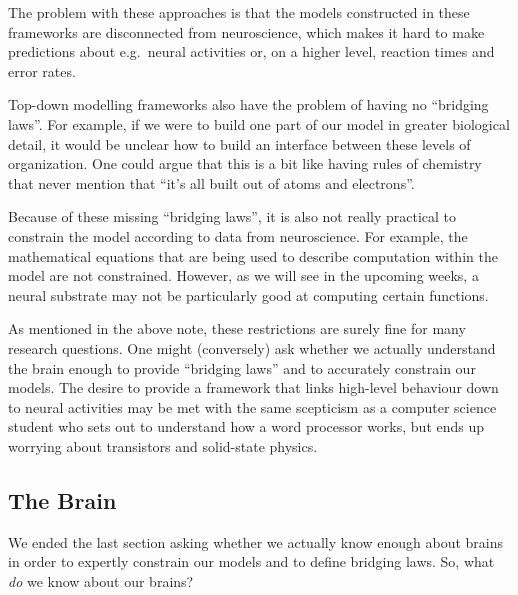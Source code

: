 \documentclass[10pt,letterpaper,oneside]{article}
\begin{document}
The problem with these approaches is that the models constructed in these frameworks are disconnected from neuroscience, which makes it hard to make predictions about e.g.~neural activities or, on a higher level, reaction times and error rates.

Top-down modelling frameworks also have the problem of having no \enquote{bridging laws}. For example, if we were to build one part of our model in greater biological detail, it would be unclear how to build an interface between these levels of organization. One could argue that this is a bit like having rules of chemistry that never mention that \enquote{it's all built out of atoms and electrons}.

Because of these missing \enquote{bridging laws}, it is also not really practical to constrain the model according to data from neuroscience. For example, the mathematical equations that are being used to describe computation within the model are not constrained. However, as we will see in the upcoming weeks, a neural substrate may not be particularly good at computing certain functions.

As mentioned in the above note, these restrictions are surely fine for many research questions. One might (conversely) ask whether we actually understand the brain enough to provide \enquote{bridging laws} and to accurately constrain our models. The desire to provide a framework that links high-level behaviour down to neural activities may be met with the same scepticism as a computer science student who sets out to understand how a word processor works, but ends up worrying about transistors and solid-state physics.




\subsection{The Brain}

We ended the last section asking whether we actually know enough about brains in order to expertly constrain our models and to define bridging laws. So, what \emph{do} we know about our brains?
\end{document}
